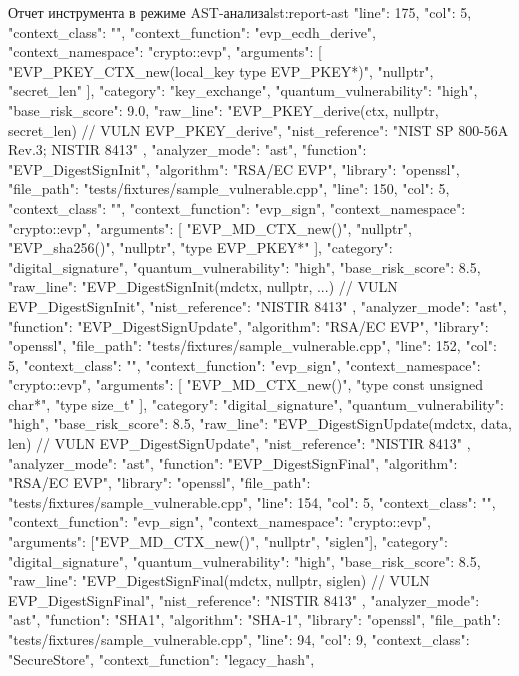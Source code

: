 \documentclass{itmo-vkr}
\begin{document}
\begin{itmolisting}[JSON]{Отчет инструмента в режиме AST-анализа}{lst:report-ast}
{{			"line": 175,
			"col": 5,
			"context_class": "",
			"context_function": "evp_ecdh_derive",
			"context_namespace": "crypto::evp",
			"arguments": [
			"EVP_PKEY_CTX_new(local_key type EVP_PKEY*)",
			"nullptr",
			"secret_len"
			],
			"category": "key_exchange",
			"quantum_vulnerability": "high",
			"base_risk_score": 9.0,
			"raw_line": "EVP_PKEY_derive(ctx, nullptr, secret_len) // VULN EVP_PKEY_derive",
			"nist_reference": "NIST SP 800-56A Rev.3; NISTIR 8413"
		},
		{
			"analyzer_mode": "ast",
			"function": "EVP_DigestSignInit",
			"algorithm": "RSA/EC EVP",
			"library": "openssl",
			"file_path": "tests/fixtures/sample_vulnerable.cpp",
			"line": 150,
			"col": 5,
			"context_class": "",
			"context_function": "evp_sign",
			"context_namespace": "crypto::evp",
			"arguments": [
			"EVP_MD_CTX_new()",
			"nullptr",
			"EVP_sha256()",
			"nullptr",
			"type EVP_PKEY*"
			],
			"category": "digital_signature",
			"quantum_vulnerability": "high",
			"base_risk_score": 8.5,
			"raw_line": "EVP_DigestSignInit(mdctx, nullptr, ...) // VULN EVP_DigestSignInit",
			"nist_reference": "NISTIR 8413"
		},
		{
			"analyzer_mode": "ast",
			"function": "EVP_DigestSignUpdate",
			"algorithm": "RSA/EC EVP",
			"library": "openssl",
			"file_path": "tests/fixtures/sample_vulnerable.cpp",
			"line": 152,
			"col": 5,
			"context_class": "",
			"context_function": "evp_sign",
			"context_namespace": "crypto::evp",
			"arguments": [
			"EVP_MD_CTX_new()",
			"type const unsigned char*",
			"type size_t"
			],
			"category": "digital_signature",
			"quantum_vulnerability": "high",
			"base_risk_score": 8.5,
			"raw_line": "EVP_DigestSignUpdate(mdctx, data, len) // VULN EVP_DigestSignUpdate",
			"nist_reference": "NISTIR 8413"
		},
		{
			"analyzer_mode": "ast",
			"function": "EVP_DigestSignFinal",
			"algorithm": "RSA/EC EVP",
			"library": "openssl",
			"file_path": "tests/fixtures/sample_vulnerable.cpp",
			"line": 154,
			"col": 5,
			"context_class": "",
			"context_function": "evp_sign",
			"context_namespace": "crypto::evp",
			"arguments": ["EVP_MD_CTX_new()", "nullptr", "siglen"],
			"category": "digital_signature",
			"quantum_vulnerability": "high",
			"base_risk_score": 8.5,
			"raw_line": "EVP_DigestSignFinal(mdctx, nullptr, siglen) // VULN EVP_DigestSignFinal",
			"nist_reference": "NISTIR 8413"
		},
		{
			"analyzer_mode": "ast",
			"function": "SHA1",
			"algorithm": "SHA-1",
			"library": "openssl",
			"file_path": "tests/fixtures/sample_vulnerable.cpp",
			"line": 94,
			"col": 9,
			"context_class": "SecureStore",
			"context_function": "legacy_hash",
}}
\end{itmolisting}
\end{document}
